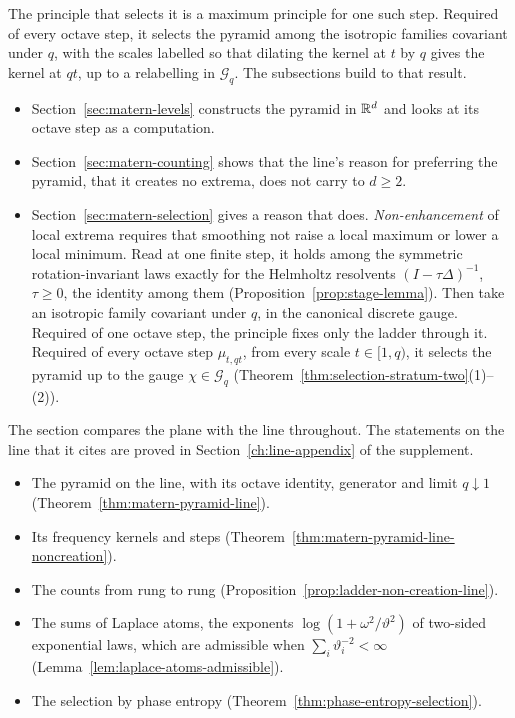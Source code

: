 The principle that selects it is a maximum principle for one such step. Required of every octave
step, it selects the \Matern{} pyramid among the isotropic families covariant under $q$, with the
scales labelled so that dilating the kernel at $t$ by $q$ gives the kernel at $qt$, up to a
relabelling in
$\mathcal{G}_q$. The subsections build to that result.
\begin{itemize}
\item Section~\ref{sec:matern-levels} constructs the pyramid in $\mathbb{R}^d$ and looks at its octave
step as a computation.
\item Section~\ref{sec:matern-counting} shows that the line's reason for preferring the pyramid,
that it creates no extrema, does not carry to $d \ge 2$.
\item Section~\ref{sec:matern-selection} gives a reason that does. \emph{Non-enhancement} of local
extrema requires that smoothing not raise a local maximum or lower a local minimum. Read at one
finite step, it holds among the symmetric rotation-invariant laws exactly for the Helmholtz
resolvents $(I - \tau\Delta)^{-1}$, $\tau \ge 0$, the identity among them
(Proposition~\ref{prop:stage-lemma}). Then take an isotropic family covariant under $q$, in the
canonical discrete gauge. Required of one octave step, the principle fixes only the ladder through
it. Required of every octave step $\mu_{t,qt}$, from every scale $t \in [1, q)$, it selects the
\Matern{} pyramid up to the gauge $\chi \in \mathcal{G}_q$
(Theorem~\ref{thm:selection-stratum-two}(1)--(2)).
\end{itemize}

The section compares the plane with the line throughout. The statements on the line that it cites
are proved in Section~\ref{ch:line-appendix} of the supplement.
\begin{itemize}
\item The \Matern{} pyramid on the line, with its octave identity, generator and limit
$q \downarrow 1$ (Theorem~\ref{thm:matern-pyramid-line}).
\item Its \Polya{} frequency kernels and steps (Theorem~\ref{thm:matern-pyramid-line-noncreation}).
\item The counts from rung to rung (Proposition~\ref{prop:ladder-non-creation-line}).
\item The sums of Laplace atoms, the exponents $\log(1 + \omega^2/\vartheta^2)$ of two-sided
exponential laws, which are admissible when $\sum_i\vartheta_i^{-2} < \infty$
(Lemma~\ref{lem:laplace-atoms-admissible}).
\item The selection by phase entropy (Theorem~\ref{thm:phase-entropy-selection}).
\end{itemize}

